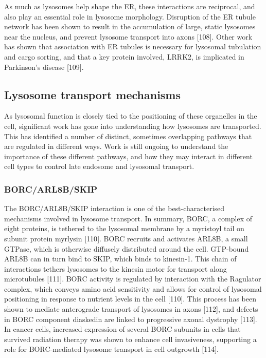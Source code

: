 \documentclass[
  12pt,
  a4paper,
]{book}
\begin{document}
As much as lysosomes help shape the ER, these interactions are reciprocal, and also play an essential role in lysosome morphology. Disruption of the ER tubule network has been shown to result in the accumulation of large, static lysosomes near the nucleus, and prevent lysosome transport into axons {[}108{]}. Other work has shown that association with ER tubules is necessary for lysosomal tubulation and cargo sorting, and that a key protein involved, LRRK2, is implicated in Parkinson's disease {[}109{]}.

\subsection{Lysosome transport mechanisms}\label{lysosome-transport-mechanisms}

As lysosomal function is closely tied to the positioning of these organelles in the cell, significant work has gone into understanding how lysosomes are transported. This has identified a number of distinct, sometimes overlapping pathways that are regulated in different ways. Work is still ongoing to understand the importance of these different pathways, and how they may interact in different cell types to control late endosome and lysosomal transport.

\subsubsection{BORC/ARL8B/SKIP}\label{borcarl8bskip}

The BORC/ARL8B/SKIP interaction is one of the best-characterised mechanisms involved in lysosome transport. In summary, BORC, a complex of eight proteins, is tethered to the lysosomal membrane by a myristoyl tail on subunit protein myrlysin {[}110{]}. BORC recruits and activates ARL8B, a small GTPase, which is otherwise diffusely distributed around the cell. GTP-bound ARL8B can in turn bind to SKIP, which binds to kinesin-1. This chain of interactions tethers lysosomes to the kinesin motor for transport along microtubules {[}111{]}. BORC activity is regulated by interaction with the Ragulator complex, which conveys amino acid sensitivity and allows for control of lysosomal positioning in response to nutrient levels in the cell {[}110{]}. This process has been shown to mediate anterograde transport of lysosomes in axons {[}112{]}, and defects in BORC component diaskedin are linked to progressive axonal dystrophy {[}113{]}. In cancer cells, increased expression of several BORC subunits in cells that survived radiation therapy was shown to enhance cell invasiveness, supporting a role for BORC-mediated lysosome transport in cell outgrowth {[}114{]}.
\end{document}
